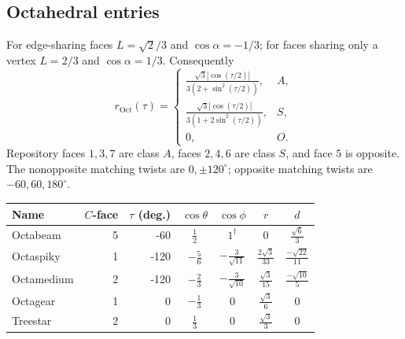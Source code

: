 \documentclass[11pt]{article}
\theoremstyle{definition}
\newcommand{\degc}{^{\circ}}
\begin{document}
\clearpage
\subsection{Octahedral entries}
For edge-sharing faces $L=\sqrt2/3$ and $\cos\alpha=-1/3$; for faces
sharing only a vertex $L=2/3$ and $\cos\alpha=1/3$. Consequently
\begin{equation}\label{eq:octfunctions}
 r_{\mathrm{Oct}}(\tau)=
 \begin{cases}
 \displaystyle\frac{\sqrt3|\cos(\tau/2)|}{3(2+\sin^2(\tau/2))},&A,\\[5pt]
 \displaystyle\frac{\sqrt3|\cos(\tau/2)|}{3(1+2\sin^2(\tau/2))},&S,\\[5pt]
 0,&O.
 \end{cases}
\end{equation}
Repository faces $1,3,7$ are class $A$, faces $2,4,6$ are class $S$, and
face $5$ is opposite. The nonopposite matching twists are
$0,\pm120\degc$; opposite matching twists are $-60,60,180\degc$.
\begin{center}
\small
\renewcommand{\arraystretch}{1.7}
\begin{tabular}{@{}lrrcccc@{}}
\toprule
Name & $C$-face & $\tau$ (deg.) & $\cos\theta$ & $\cos\phi$ & $r$ & $d$\\
\midrule
Octabeam & 5 & -60 & $\displaystyle \frac{1}{2}$ & $\displaystyle 1^{\dagger}$ & $\displaystyle 0$ & $\displaystyle \frac{\sqrt{6}}{3}$\\
Octaspiky & 1 & -120 & $\displaystyle - \frac{5}{6}$ & $\displaystyle - \frac{3}{\sqrt{11}}$ & $\displaystyle \frac{2 \sqrt{3}}{33}$ & $\displaystyle \frac{- \sqrt{22}}{11}$\\
Octamedium & 2 & -120 & $\displaystyle - \frac{2}{3}$ & $\displaystyle - \frac{3}{\sqrt{10}}$ & $\displaystyle \frac{\sqrt{3}}{15}$ & $\displaystyle \frac{- \sqrt{10}}{5}$\\
Octagear & 1 & 0 & $\displaystyle - \frac{1}{3}$ & $\displaystyle 0$ & $\displaystyle \frac{\sqrt{3}}{6}$ & $\displaystyle 0$\\
Treestar & 2 & 0 & $\displaystyle \frac{1}{3}$ & $\displaystyle 0$ & $\displaystyle \frac{\sqrt{3}}{3}$ & $\displaystyle 0$\\
\bottomrule
\end{tabular}
\end{center}

\clearpage
\end{document}
